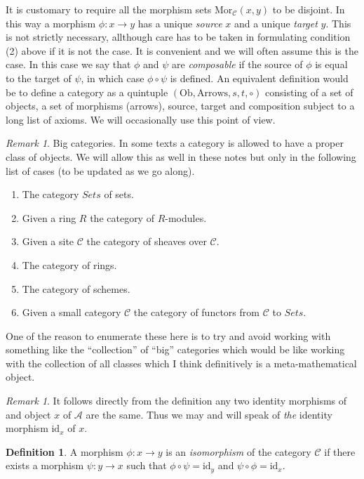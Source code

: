 \documentclass{amsart}
\theoremstyle{definition}
\newtheorem{definition}[theorem]{Definition}
\theoremstyle{remark}
\newtheorem{remark}[theorem]{Remark}
\numberwithin{equation}{subsection}
\begin{document}
\noindent
It is customary to require all the morphism sets
$\text{Mor}_{\mathcal{C}}(x,y)$ to be disjoint.
In this way a morphism $\phi: x \to y$ has a unique {\it source} $x$
and a unique {\it target} $y$. This is not strictly necessary,
allthough care has to be taken in formulating condition (2) above
if it is not the case. It is convenient and we will often assume
this is the case. In this case we say that $\phi$ and $\psi$ are
{\it composable} if the source of $\phi$ is equal to the 
target of $\psi$, in which case $\phi \circ \psi$ is defined.
An equivalent definition would be to define a category
as a quintuple $(\text{Ob}, \text{Arrows}, s, t, \circ)$
consisting of a set of objects, a set of morphisms (arrows),
source, target and composition subject to a long list of axioms.
We will occasionally use this point of view.

\begin{remark}
\label{remark-big-categories}
Big categories. In some texts a category is allowed to have a proper
class of objects. We will allow this as well in these notes but only
in the following list of cases (to be updated as we go along).
\begin{enumerate}
\item The category $\textit{Sets}$ of sets.
\item Given a ring $R$ the category of $R$-modules.
\item Given a site $\mathcal{C}$ the category of sheaves
over $\mathcal{C}$.
\item The category of rings.
\item The category of schemes.
\item Given a small category $\mathcal{C}$ the category of functors
from $\mathcal{C}$ to $\textit{Sets}$.
\end{enumerate}
One of the reason to enumerate these here is to try and avoid 
working with something like the ``collection'' of ``big'' categories
which would be like working with the collection of all classes
which I think definitively is a meta-mathematical object.
\end{remark}

\begin{remark}
\label{remark-unique-indentity}
It follows directly from the definition any two identity morphisms
of and object $x$ of $\mathcal{A}$ are the same. Thus we may and will
speak of {\it the} identity morphism $\text{id}_x$ of $x$.
\end{remark}

\begin{definition}
\label{definition-isomorphism}
A morphism $\phi : x \to y$ is an {\it isomorphism} of the category
$\mathcal{C}$ if there exists a morphism $\psi : y \to x$
such that $\phi \circ \psi = \text{id}_y$ and
$\psi \circ \phi = \text{id}_x$.
\end{definition}
\end{document}
